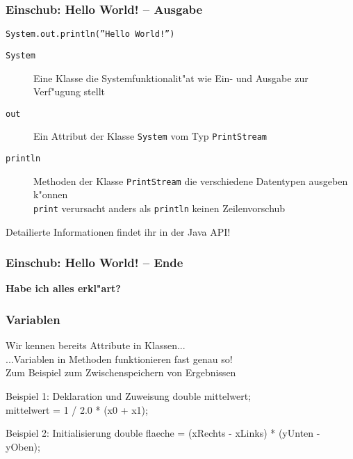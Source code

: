\documentclass{beamer}
\begin{document}
\begin{frame}
\frametitle{Einschub: Hello World! -- Ausgabe}
\begin{block}{\texttt{System.out.println(\textrm{''}Hello World!\textrm{''})}}
\begin{description}
\item[\texttt{System}] Eine Klasse die Systemfunktionalit"at wie Ein- und Ausgabe zur Verf"ugung stellt\\
\item[\texttt{out}] Ein Attribut der Klasse \texttt{System} vom Typ \texttt{PrintStream}\\
\item[\texttt{println}] Methoden der Klasse \texttt{PrintStream} die verschiedene Datentypen ausgeben k"onnen\\ \texttt{print} verursacht anders als \texttt{println} keinen Zeilenvorschub
\end{description}
\alert{Detailierte Informationen findet ihr in der Java API!}
\end{block}
\end{frame}


\begin{frame}
\frametitle{Einschub: Hello World! -- Ende}

\begin{center}
\textbf{\Huge Habe ich alles erkl"art?}
\end{center}
\end{frame}


\begin{frame}
\frametitle{Variablen}
\begin{block}{}
Wir kennen bereits Attribute in Klassen...\pause\\
...Variablen in Methoden funktionieren fast genau so!\pause\\[0.5em]
Zum Beispiel zum Zwischenspeichern von Ergebnissen
\end{block}

\pause

\begin{block}{Beispiel 1: Deklaration und Zuweisung}
\ttfamily
double mittelwert;\\
mittelwert = 1 / 2.0 * (x0 + x1);
\end{block}

\begin{block}{Beispiel 2: Initialisierung}
\ttfamily
double flaeche = (xRechts - xLinks) * (yUnten - yOben);
\end{block}

\end{frame}
\end{document}
